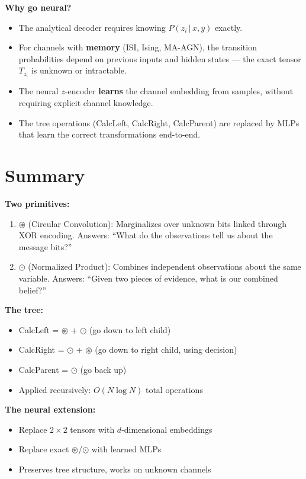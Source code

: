 \documentclass[11pt,a4paper]{article}
\newcommand{\conv}{\circledast}
\newcommand{\nprod}{\odot}
\begin{document}
\textbf{Why go neural?}
\begin{itemize}[nosep]
\item The analytical decoder requires knowing $P(z_i \,|\, x, y)$ exactly.
\item For channels with \textbf{memory} (ISI, Ising, MA-AGN), the transition probabilities depend on previous inputs and hidden states — the exact tensor $T_{z_i}$ is unknown or intractable.
\item The neural $z$-encoder \textbf{learns} the channel embedding from samples, without requiring explicit channel knowledge.
\item The tree operations (CalcLeft, CalcRight, CalcParent) are replaced by MLPs that learn the correct transformations end-to-end.
\end{itemize}

\section{Summary}

\begin{tcolorbox}[colback=yellow!5,colframe=orange,title=The Complete Picture]

\textbf{Two primitives:}
\begin{enumerate}[nosep]
\item \textcolor{convblue}{$\conv$ (Circular Convolution)}: Marginalizes over unknown bits linked through XOR encoding. Answers: ``What do the observations tell us about the message bits?''
\item \textcolor{prodgreen}{$\nprod$ (Normalized Product)}: Combines independent observations about the same variable. Answers: ``Given two pieces of evidence, what is our combined belief?''
\end{enumerate}

\textbf{The tree:}
\begin{itemize}[nosep]
\item CalcLeft = $\conv$ + $\nprod$ (go down to left child)
\item CalcRight = $\nprod$ + $\conv$ (go down to right child, using decision)
\item CalcParent = $\nprod$ (go back up)
\item Applied recursively: $O(N \log N)$ total operations
\end{itemize}

\textbf{The neural extension:}
\begin{itemize}[nosep]
\item Replace $2\times 2$ tensors with $d$-dimensional embeddings
\item Replace exact $\conv$/$\nprod$ with learned MLPs
\item Preserves tree structure, works on unknown channels
\end{itemize}

\end{tcolorbox}
\end{document}
